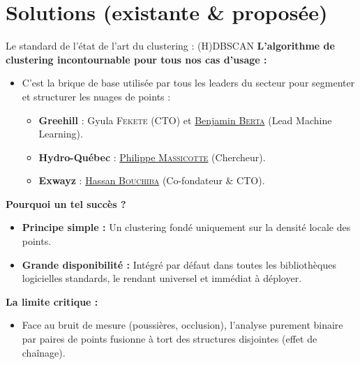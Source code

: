 \documentclass[A4,svgnames,9pt,aspectratio=169]{beamer}
\begin{document}
\section{Solutions (existante \& proposée)}
\begin{frame}{Le standard de l'état de l'art du clustering : (H)DBSCAN}
    \textbf{\bleu L'algorithme de clustering incontournable pour tous nos cas d'usage :}
    \begin{itemize}
        \item C'est la brique de base utilisée par tous les leaders du secteur pour segmenter et structurer les nuages de points :
        \begin{itemize}
            \item \textbf{Greehill} : Gyula \textsc{Fekete} (CTO) et \href{https://www.linkedin.com/in/benjamin-berta/?locale=hu}{Benjamin \textsc{Berta}} (Lead Machine Learning).
            \item \textbf{Hydro-Québec} : \href{https://www.linkedin.com/in/philippemassicotte/}{Philippe \textsc{Massicotte}} (Chercheur).
            \item \textbf{Exwayz} : \href{https://www.linkedin.com/in/hassan-bouchiba-434078202/}{Hassan \textsc{Bouchiba}} (Co-fondateur \& CTO).
        \end{itemize}
    \end{itemize}
    
    \vspace{0.3cm}
    
    \textbf{\bleu Pourquoi un tel succès ?}
    \begin{itemize}
        \item \textbf{Principe simple :} Un clustering fondé uniquement sur la densité locale des points.
        \item \textbf{Grande disponibilité :} Intégré par défaut dans toutes les bibliothèques logicielles standards, le rendant universel et immédiat à déployer.
    \end{itemize}
    
    \vspace{0.3cm}
    
    \textbf{\bleu La limite critique :}
    \begin{itemize}
        \item Face au bruit de mesure (poussières, occlusion), l'analyse purement binaire par paires de points fusionne à tort des structures disjointes (effet de chaînage).
    \end{itemize}
\end{frame}
\end{document}

